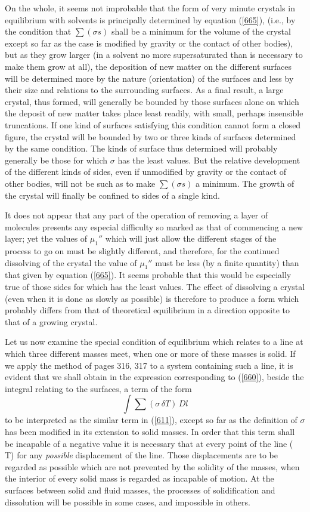 \documentclass[12pt]{article}
\newcommand{\dd}{\delta}
\begin{document}
{On the whole, it seems not improbable that the form of very minute crystals in equilibrium with solvents is principally determined by equation (\ref{665}), (i.e., by the condition that $\sum(\sigma s)$ shall be a minimum for the volume of the crystal except so far as the case is modified by gravity or the contact of other bodies), but as they grow larger (in a solvent no more supersaturated than is necessary to make them grow at all), the deposition of new matter on the different surfaces will be determined more by the nature (orientation) of the surfaces and less by their size and relations to the surrounding surfaces.  As a final result, a large crystal, thus formed, will generally be bounded by those surfaces alone on which the deposit of new matter takes place least readily, with small, perhaps insensible truncations. If one kind of surfaces satisfying this condition cannot form a closed figure, the crystal will be bounded by two or three kinds of surfaces determined by the same condition. The kinds of surface thus determined will probably generally be those for which $\sigma$ has the least values. But the relative development of the different kinds of sides, even if unmodified by gravity or the contact of other bodies, will not be such as to make $\sum(\sigma s)$ a minimum. The growth of the crystal will finally be confined to sides of a single kind.\par
It does not appear that any part of the operation of removing a layer of molecules presents any especial difficulty so marked as that of commencing a new layer; yet the values of $\mu_1''$ which will just allow the different stages of the process to go on must be slightly different, and therefore, for the continued dissolving of the crystal the value of $\mu_1''$ must be less (by a finite quantity) than that given by equation (\ref{665}). It seems probable that this would be especially true of those sides for which  has the least values. The effect of dissolving a crystal (even when it is done as slowly as possible) is therefore to produce a form which probably differs from that of theoretical equilibrium in a direction opposite to that of a growing crystal.}

Let us now examine the special condition of equilibrium which relates to a line at which three different masses meet, when one or more of these masses is solid. If we apply the method of pages 316, 317 to a system containing such a line, it is evident that we shall obtain in the expression corresponding to (\ref{660}), beside the integral relating to the surfaces, a term of the form
$$ \int \sum(\sigma \, \dd T) \, Dl$$
to be interpreted as the similar term in (\ref{611}), except so far as the definition of $\sigma$ has been modified in its extension to solid masses. In order that this term shall be incapable of a negative value it is necessary that at every point of the line
\eqs \sum(\sigma \, \dd T)    \label{671} \eqe
for any \textit{possible} displacement of the line. Those displacements are to be regarded as possible which are not prevented by the solidity of the masses, when the interior of every solid mass is regarded as incapable of motion. At the surfaces between solid and fluid masses, the processes of solidification and dissolution will be possible in some cases, and impossible in others.
\end{document}
